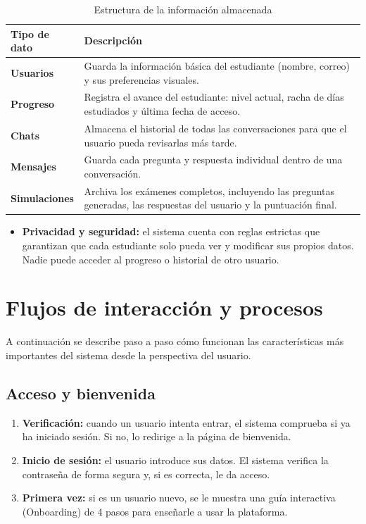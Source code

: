 \begin{table}[H]
\centering
\small
\renewcommand{\arraystretch}{1.3}
\begin{tabularx}{\textwidth}{p{2.5cm} X}
\toprule
\textbf{Tipo de dato} & \textbf{Descripción} \\
\midrule
\textbf{Usuarios} & Guarda la información básica del estudiante (nombre, correo) y sus preferencias visuales. \\
\midrule
\textbf{Progreso} & Registra el avance del estudiante: nivel actual, racha de días estudiados y última fecha de acceso. \\
\midrule
\textbf{Chats} & Almacena el historial de todas las conversaciones para que el usuario pueda revisarlas más tarde. \\
\midrule
\textbf{Mensajes} & Guarda cada pregunta y respuesta individual dentro de una conversación. \\
\midrule
\textbf{Simulaciones} & Archiva los exámenes completos, incluyendo las preguntas generadas, las respuestas del usuario y la puntuación final. \\
\bottomrule
\end{tabularx}
\vspace{0.5em}
\caption{Estructura de la información almacenada}
\label{tab:4-1}
\end{table}

\begin{itemize}
\item \textbf{Privacidad y seguridad:}
    el sistema cuenta con reglas estrictas que garantizan que cada estudiante solo pueda ver y modificar sus propios datos. Nadie puede acceder al progreso o historial de otro usuario.
\end{itemize}

\section{Flujos de interacción y procesos}
A continuación se describe paso a paso cómo funcionan las características más importantes del sistema desde la perspectiva del usuario.

\subsection{Acceso y bienvenida}
\begin{enumerate}
\item \textbf{Verificación:} cuando un usuario intenta entrar, el sistema comprueba si ya ha iniciado sesión. Si no, lo redirige a la página de bienvenida.
\item \textbf{Inicio de sesión:} el usuario introduce sus datos. El sistema verifica la contraseña de forma segura y, si es correcta, le da acceso.
\item \textbf{Primera vez:} si es un usuario nuevo, se le muestra una guía interactiva (Onboarding) de 4 pasos para enseñarle a usar la plataforma.
\end{enumerate}

